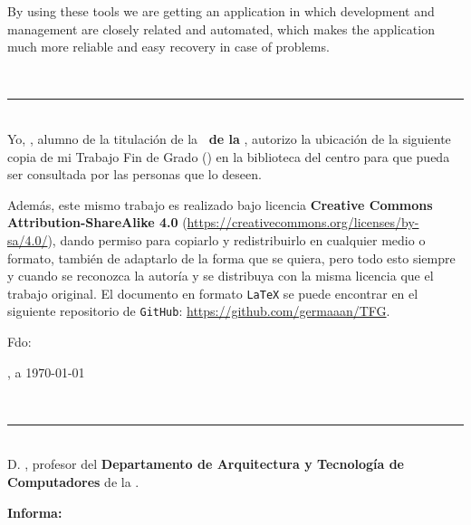 {{\bigskip
By using these tools we are getting an application in which development and management are closely related and automated, which makes the application much more reliable and easy recovery in case of problems.

\newpage
\thispagestyle{empty}
\
\vspace{3cm}

\noindent\rule[-1ex]{\textwidth}{2pt}\\[4.5ex]

Yo, \textbf{\autor}, alumno de la titulación \textbf{\titulacion} de la \textbf{\escuela\ de la \universidad}, autorizo la ubicación de la siguiente copia de mi Trabajo Fin de Grado (\textit{\titulo}) en la biblioteca del centro para que pueda ser consultada por las personas que lo deseen.

\bigskip
Además, este mismo trabajo es realizado bajo licencia \textbf{Creative Commons Attribution-ShareAlike 4.0} (\url{https://creativecommons.org/licenses/by-sa/4.0/}), dando permiso para copiarlo y redistribuirlo en cualquier medio o formato, también de adaptarlo de la forma que se quiera, pero todo esto siempre y cuando se reconozca la autoría y se distribuya con la misma licencia que el trabajo original. El documento en formato {\tt LaTeX} se puede encontrar en el siguiente repositorio de {\tt GitHub}: \url{https://github.com/germaaan/TFG}.

\vspace{4cm}

\noindent Fdo: \autor

\vspace{2cm}

\begin{flushright}
\ciudad, a \today
\end{flushright}

\newpage
\thispagestyle{empty}
\
\vspace{3cm}

\noindent\rule[-1ex]{\textwidth}{2pt}\\[4.5ex]

D. \textbf{\tutor}, profesor del \textbf{Departamento de Arquitectura y Tecnología de Computadores} de la \textbf{\universidad}.

\vspace{0.5cm}

\vspace{0.5cm}

\textbf{Informa:}

\vspace{0.5cm}

}}
